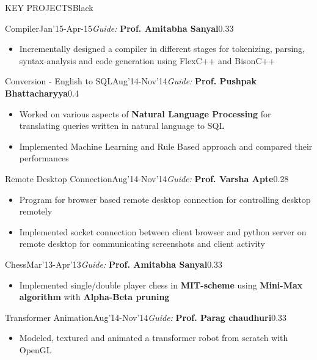 \documentclass[11pt,a4paper]{article} %
\begin{document}
\begin{ressection}{KEY PROJECTS}{Black}

  
\begin{ressubsection}{Compiler}{Jan'15-Apr-15}{\textit{Guide:} \textbf{Prof. Amitabha Sanyal}}{0.33}
\begin{itemize}
\itemsep-0.3em
\item Incrementally designed a compiler in different stages for tokenizing, parsing, syntax-analysis and code generation using FlexC++ and BisonC++
\end{itemize}
\end{ressubsection}

\begin{ressubsection}{Conversion - English to SQL}{Aug'14-Nov'14}{\textit{Guide:} \textbf{Prof. Pushpak Bhattacharyya}}{0.4}
\begin{itemize}
\itemsep-0.3em
\item Worked on various aspects of \textbf{Natural Language Processing} for translating queries written in natural language to SQL
\item Implemented Machine Learning and Rule Based approach and compared their performances
\end{itemize}
\end{ressubsection}

\begin{ressubsection}{Remote Desktop Connection}{Aug'14-Nov'14}{\textit{Guide:} \textbf{Prof. Varsha Apte}}{0.28}
\begin{itemize}
\itemsep-0.3em
\item Program for browser based remote desktop connection for controlling desktop remotely
\item Implemented socket connection between client browser and python server on remote desktop for communicating screenshots and client activity
\end{itemize}
\end{ressubsection}


\begin{ressubsection}{Chess}{Mar'13-Apr'13}{\textit{Guide:} \textbf{Prof. Amitabha Sanyal}}{0.33}
\begin{itemize}
\itemsep-0.3em
\item Implemented single/double player chess in \textbf{MIT-scheme} using \textbf{Mini-Max algorithm} with \textbf{Alpha-Beta pruning}
\end{itemize}
\end{ressubsection}

\begin{ressubsection}{Transformer Animation}{Aug'14-Nov'14}{\textit{Guide:} \textbf{Prof. Parag chaudhuri}}{0.33}
\begin{itemize}
\itemsep-0.3em
\item Modeled, textured and animated a transformer robot from scratch with OpenGL
\end{itemize}
\end{ressubsection}

\end{ressection}
\end{document}
